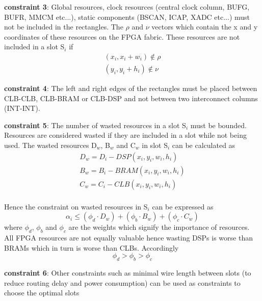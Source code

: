 \documentclass[11pt]{article}
\theoremstyle{definition}
\begin{document}
\textbf{constraint 3}: Global resources, clock resources (central clock column, BUFG, BUFR, MMCM etc...), static components (BSCAN, ICAP, XADC etc...) must not be included in the rectangles. The $\rho$ and $\nu$ vectors which contain the x and y coordinates of these resources on the FPGA fabric. These resources are not included in a slot S$_i$ if 
\begin{equation}
\begin{split}
(x_i, x_i+w_i) \notin \rho \\
(y_i, y_i+h_i) \notin \nu
\end{split}
\end{equation}

\textbf{constraint 4}: The left and right edges of the rectangles must be placed between CLB-CLB, CLB-BRAM or CLB-DSP and not between two interconnect columns (INT-INT).

\textbf{constraint 5}: The number of wasted resources in a slot S$_i$ must be bounded. Resources are considered wasted if they are included in a slot while not being used.  The wasted resources D$_{w}$, B$_w$ and C$_w$ in slot S$_i$ can be calculated as
\begin{equation}
\begin{split}
D_w = D_i - DSP(x_i, y_i, w_i, h_i) \\
B_w = B_i - BRAM(x_i, y_i, w_i, h_i) \\
C_w = C_i - CLB(x_i, y_i, w_i, h_i) \\ 
\end{split}
\end{equation}

Hence the constraint on wasted resources in S$_i$ can be expressed as 
\begin{equation}
\alpha_i \leq (\phi_d \cdot D_w) + (\phi_b \cdot B_w) + (\phi_c \cdot C_w)
\end{equation}
where $\phi_d$, $\phi_b$ and $\phi_c$ are the weights which signify the importance of resources. All FPGA resources are not equally valuable hence wasting DSPs is worse than BRAMs which in turn is worse than CLBs. Accordingly 
\begin{equation}
\phi_d > \phi_b > \phi_c
\end{equation}

\textbf{constraint 6}: Other constraints such as minimal wire length between slots (to reduce routing delay and power consumption) can be used as constraints to choose the optimal slots \\
\end{document}
